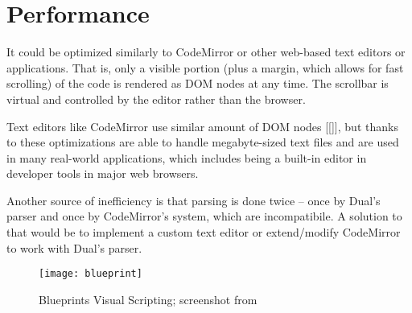 \section{Performance}
It could be optimized similarly to CodeMirror or other web-based text editors or
applications. That is, only a visible portion (plus a margin, which allows for
fast scrolling) of the code is rendered as DOM nodes at any time. The scrollbar
is virtual and controlled by the editor rather than the browser.

Text editors like CodeMirror use similar amount of DOM nodes [[]], but thanks to
these optimizations are able to handle
megabyte-sized\cite[Section~General Approach]{cm_internals}
text files and are used in many real-world
applications\cite{cm_realworld}, which
includes being a built-in editor in developer tools in major web browsers.

Another source of inefficiency is that parsing is done twice -- once by Dual's
parser and once by CodeMirror's system, which are incompatibile.  A solution to
that would be to implement a custom text editor or extend/modify CodeMirror to
work with Dual's parser.


\begin{figure}[h!]
\centering \texttt{[image: blueprint]}
\caption{
    Blueprints Visual Scripting;
    screenshot from \protect\cite{fig_blueprint2}
}
\label{fig:blueprint2}
\end{figure}


